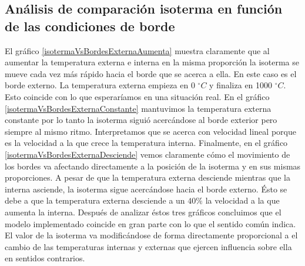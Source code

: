 \subsection{Análisis de comparación isoterma en función de las condiciones de borde}

El gráfico \ref{isotermaVsBordesExternaAumenta} muestra claramente que al aumentar la temperatura
externa e interna en la misma proporción la isoterma se mueve cada vez más rápido hacia el borde que
se acerca a ella. En este caso es el borde externo. La temperatura externa empieza en 0 $^{\circ}C$ y
finaliza en 1000 $^{\circ}C$. Esto coincide con lo que esperaríamos en una situación real.  En el gráfico
\ref{isotermaVsBordesExternaConstante} mantuvimos la temperatura externa constante por lo tanto la
isoterma siguió acercándose al borde exterior pero siempre al mismo ritmo. Interpretamos que se
acerca con velocidad lineal porque es la velocidad a la que crece la temperatura interna.
Finalmente, en el gráfico \ref{isotermaVsBordesExternaDesciende} vemos claramente cómo el movimiento
de los bordes va afectando directamente a la posición de la isoterma y en sus mismas proporciones. A
pesar de que la temperatura externa desciende mientras que la interna asciende, la isoterma sigue
acercándose hacia el borde externo. Ésto se debe a que la temperatura externa desciende a un $40\%$
la velocidad a la que aumenta la interna.  Después de analizar éstos tres gráficos concluimos que el
modelo implementado coincide en gran parte con lo que el sentido común indica. El valor de la
isoterma va modificándose de forma directamente proporcional a el cambio de las temperaturas
internas y externas que ejercen influencia sobre ella en sentidos contrarios.
